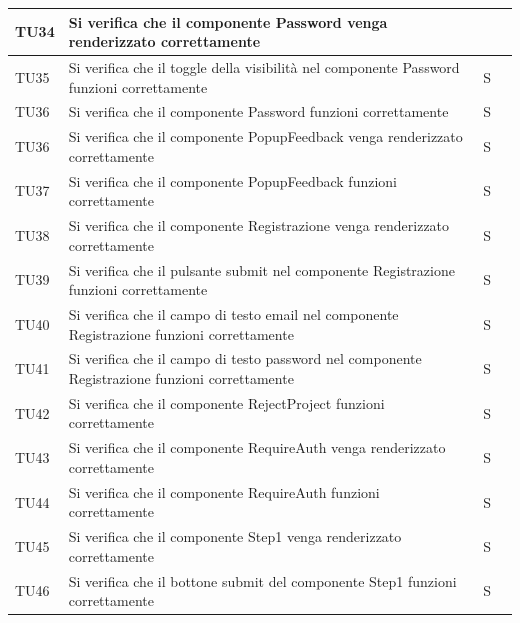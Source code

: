 \documentclass{article}
\begin{document}
\begin{center}
\begin{tabular}{P{5em} P{21em} P{6em} P{6em}}
    \hline
     \end{tabular}
        \end{center}
    \begin{center}
    \begin{tabular}{P{5em} P{21em} P{6em} P{6em}}
     TU34 & Si verifica che il componente Password venga renderizzato correttamente    & \\
    \hline
    TU35& Si verifica che il toggle della visibilità nel componente Password funzioni correttamente & S\\
    \hline{}
     TU36 & Si verifica che il componente Password funzioni correttamente    &S \\
    \hline
    TU36&Si verifica che il componente PopupFeedback venga renderizzato correttamente & S\\
    \hline{}
     TU37 & Si verifica che il componente PopupFeedback funzioni correttamente  & S  \\
    \hline
    TU38&Si verifica che il componente Registrazione venga renderizzato correttamente  & S\\
    \hline{}
     TU39 & Si verifica che il pulsante submit nel componente Registrazione funzioni correttamente    &S \\
    \hline
    TU40&  Si verifica che il campo di testo email nel componente Registrazione funzioni correttamente& S\\
    \hline{}
     TU41 & Si verifica che il campo di testo password nel componente Registrazione funzioni correttamente  &S \\
    \hline
    TU42& Si verifica che il componente RejectProject funzioni correttamente &S \\
    \hline{}
     TU43 & Si verifica che il componente RequireAuth venga renderizzato correttamente    & S\\
    \hline
    TU44& Si verifica che il componente RequireAuth funzioni correttamente  & S\\
    \hline{}
     TU45 & Si verifica che il componente Step1 venga renderizzato correttamente  &S  \\
    \hline
    TU46& Si verifica che il bottone submit del componente Step1 funzioni correttamente  & S\\

\end{tabular}
\end{center}
\end{document}
